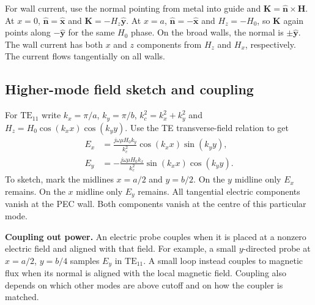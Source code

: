 \documentclass[12pt,a4paper]{article}
\begin{document}
For wall current, use the normal pointing from metal into guide and $\mathbf K=\hat{\mathbf n}\times\mathbf H$. At $x=0$, $\hat{\mathbf n}=\hat{\mathbf x}$ and $\mathbf K=-H_z\hat{\mathbf y}$. At $x=a$, $\hat{\mathbf n}=-\hat{\mathbf x}$ and $H_z=-H_0$, so $\mathbf K$ again points along $-\hat{\mathbf y}$ for the same $H_0$ phase. On the broad walls, the normal is $\pm\hat{\mathbf y}$. The wall current has both $x$ and $z$ components from $H_z$ and $H_x$, respectively. The current flows tangentially on all walls.

\subsection{Higher-mode field sketch and coupling}
For $\mathrm{TE}_{11}$ write $k_x=\pi/a$, $k_y=\pi/b$, $k_c^2=k_x^2+k_y^2$ and $H_z=H_0\cos(k_xx)\cos(k_yy)$. Use the TE transverse-field relation to get
\[
\begin{aligned}
 E_x &= \frac{j\omega\mu H_0 k_y}{k_c^2}\cos(k_xx)\sin(k_yy),\\
 E_y &=-\frac{j\omega\mu H_0 k_x}{k_c^2}\sin(k_xx)\cos(k_yy).
\end{aligned}
\]
To sketch, mark the midlines $x=a/2$ and $y=b/2$. On the $y$ midline only $E_x$ remains. On the $x$ midline only $E_y$ remains. All tangential electric components vanish at the PEC wall. Both components vanish at the centre of this particular mode.
\begin{tcolorbox}[tikzbox,title={TE11 cross-section at one field phase},unbreakable]
\centering
{}
\end{tcolorbox}

\textbf{Coupling out power.} An electric probe couples when it is placed at a nonzero electric field and aligned with that field. For example, a small $y$-directed probe at $x=a/2$, $y=b/4$ samples $E_y$ in $\mathrm{TE}_{11}$. A small loop instead couples to magnetic flux when its normal is aligned with the local magnetic field. Coupling also depends on which other modes are above cutoff and on how the coupler is matched.
\end{document}

